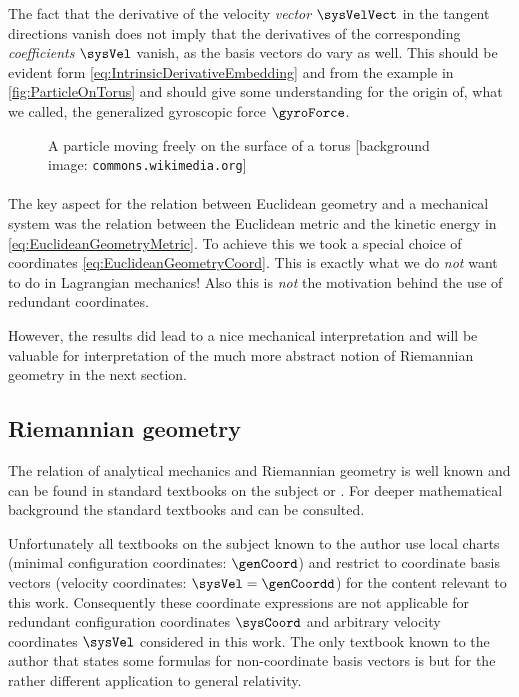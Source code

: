 The fact that the derivative of the velocity \textit{vector} $\sysVelVect$ in the tangent directions vanish does not imply that the derivatives of the corresponding \textit{coefficients} $\sysVel$ vanish, as the basis vectors do vary as well.
This should be evident form \eqref{eq:IntrinsicDerivativeEmbedding} and from the example in \autoref{fig:ParticleOnTorus} and should give some understanding for the origin of, what we called, the generalized gyroscopic force $\gyroForce$.

\begin{figure}[t]
 \centering
 
 \caption{A particle moving freely on the surface of a torus [background image: \texttt{commons.wikimedia.org}]}
 \label{fig:ParticleOnTorus}
\end{figure}

\paragraph{}
The key aspect for the relation between Euclidean geometry and a mechanical system was the relation between the Euclidean metric and the kinetic energy in \eqref{eq:EuclideanGeometryMetric}.
To achieve this we took a special choice of coordinates \eqref{eq:EuclideanGeometryCoord}.
This is exactly what we do \textit{not} want to do in Lagrangian mechanics!
Also this is \textit{not} the motivation behind the use of redundant coordinates.

However, the results did lead to a nice mechanical interpretation and will be valuable for interpretation of the much more abstract notion of Riemannian geometry in the next section.


\subsection{Riemannian geometry}
The relation of analytical mechanics and Riemannian geometry is well known and can be found in standard textbooks on the subject \eg \cite{Frankel:GeometryOfPhysics} or \cite{Abraham:FoundationsOfMechanics}.
For deeper mathematical background the standard textbooks \cite{Boothby:DiffGeo} and \cite{Spivak:DiffGeo} can be consulted.

Unfortunately all textbooks on the subject known to the author use local charts (minimal configuration coordinates: $\genCoord$) and restrict to coordinate basis vectors (velocity coordinates: $\sysVel = \genCoordd$) for the content relevant to this work.
Consequently these coordinate expressions are not applicable for redundant configuration coordinates $\sysCoord$ and arbitrary velocity coordinates $\sysVel$ considered in this work. 
The only textbook known to the author that states some formulas for non-coordinate basis vectors is \cite{Misner:Gravitation} but for the rather different application to general relativity.

